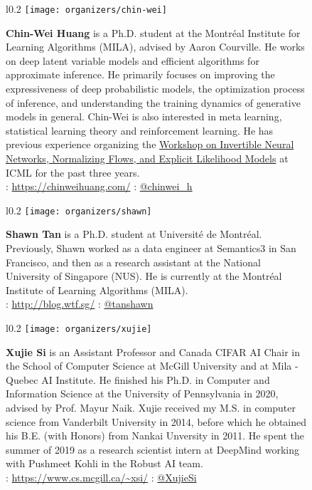 \documentclass{article}
\begin{document}
    \begin{figure}[H]
        \begin{wrapfigure}{l}{0.2\textwidth}
            \texttt{[image: organizers/chin-wei]}
        \end{wrapfigure}
        \textbf{Chin-Wei Huang} is a Ph.D. student at the Montr\'eal Institute for Learning Algorithms (MILA), advised by Aaron Courville. He works on deep latent variable models and efficient algorithms for approximate inference. He primarily focuses on improving the expressiveness of deep probabilistic models, the optimization process of inference, and understanding the training dynamics of generative models in general. Chin-Wei is also interested in meta learning, statistical learning theory and reinforcement learning. He has previous experience organizing the \href{https://invertibleworkshop.github.io/}{Workshop on Invertible Neural Networks, Normalizing Flows, and Explicit Likelihood Models} at ICML for the past three years.\\
        \faHome: \url{https://chinweihuang.com/} \faTwitter: \href{https://twitter.com/chinwei_h}{@chinwei\_h}
    \end{figure}

    \begin{figure}[H]
        \begin{wrapfigure}{l}{0.2\textwidth}
            \texttt{[image: organizers/shawn]}
        \end{wrapfigure}
        \textbf{Shawn Tan} is a Ph.D. student at Universit\'e de Montr\'eal.
        Previously, Shawn worked as a data engineer at Semantics3 in San Francisco, and then as a research assistant at the National University of Singapore (NUS). He is currently at the Montr\'eal Institute of Learning Algorithms (MILA).\\
        \faHome: \url{http://blog.wtf.sg/} \faTwitter: \href{https://twitter.com/tanshawn}{@tanshawn}
    \end{figure}

    \pagebreak
    \begin{figure}[H]
        \begin{wrapfigure}{l}{0.2\textwidth}
            \texttt{[image: organizers/xujie]}
        \end{wrapfigure}
        \textbf{Xujie Si} is an Assistant Professor and Canada CIFAR AI Chair in the School of Computer Science at McGill University and at Mila - Quebec AI Institute. He finished his Ph.D. in Computer and Information Science at the University of Pennsylvania in 2020, advised by Prof. Mayur Naik. Xujie received my M.S. in computer science from Vanderbilt University in 2014, before which he obtained his B.E. (with Honors) from Nankai Unversity in 2011. He spent the summer of 2019 as a research scientist intern at DeepMind working with Pushmeet Kohli in the Robust AI team.\\
        \faHome: \url{https://www.cs.mcgill.ca/~xsi/} \faTwitter: \href{https://twitter.com/xujiesi}{@XujieSi}
    \end{figure}
\end{document}
